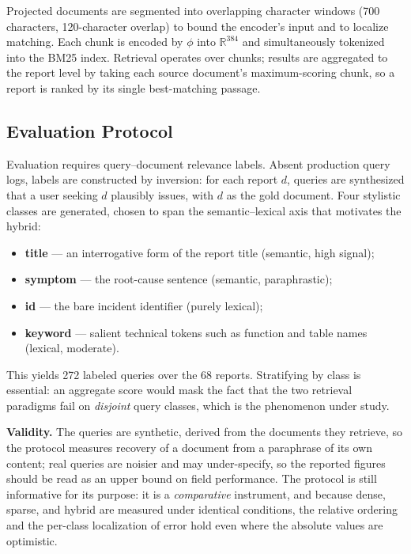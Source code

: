 \documentclass[12pt, a4paper]{article}
\begin{document}
Projected documents are segmented into overlapping character windows (700 characters, 120-character overlap) to bound the encoder's input and to localize matching. Each chunk is encoded by $\phi$ into $\mathbb{R}^{384}$ and simultaneously tokenized into the BM25 index. Retrieval operates over chunks; results are aggregated to the report level by taking each source document's maximum-scoring chunk, so a report is ranked by its single best-matching passage.

\subsection{Evaluation Protocol}

Evaluation requires query--document relevance labels. Absent production query logs, labels are constructed by inversion: for each report $d$, queries are synthesized that a user seeking $d$ plausibly issues, with $d$ as the gold document. Four stylistic classes are generated, chosen to span the semantic--lexical axis that motivates the hybrid:

\begin{itemize}
    \item \textbf{title} — an interrogative form of the report title (semantic, high signal);
    \item \textbf{symptom} — the root-cause sentence (semantic, paraphrastic);
    \item \textbf{id} — the bare incident identifier (purely lexical);
    \item \textbf{keyword} — salient technical tokens such as function and table names (lexical, moderate).
\end{itemize}

This yields 272 labeled queries over the 68 reports. Stratifying by class is essential: an aggregate score would mask the fact that the two retrieval paradigms fail on \emph{disjoint} query classes, which is the phenomenon under study.

\textbf{Validity.} The queries are synthetic, derived from the documents they retrieve, so the protocol measures recovery of a document from a paraphrase of its own content; real queries are noisier and may under-specify, so the reported figures should be read as an upper bound on field performance. The protocol is still informative for its purpose: it is a \emph{comparative} instrument, and because dense, sparse, and hybrid are measured under identical conditions, the relative ordering and the per-class localization of error hold even where the absolute values are optimistic.
\end{document}
